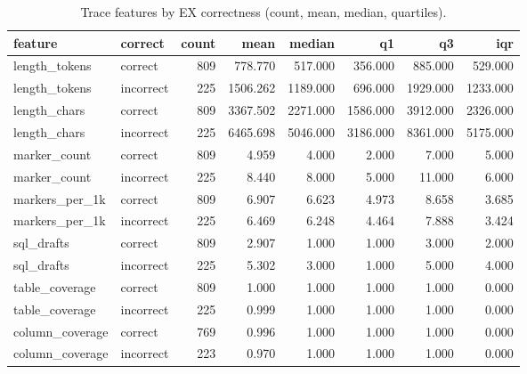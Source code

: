 \begin{table}[htbp]
\caption{Trace features by EX correctness (count, mean, median, quartiles).}
\label{tab:task2_desc_by_correctness}
\begin{tabular}{llrrrrrr}
\toprule
feature & correct & count & mean & median & q1 & q3 & iqr \\
\midrule
length_tokens & correct & 809 & 778.770 & 517.000 & 356.000 & 885.000 & 529.000 \\
length_tokens & incorrect & 225 & 1506.262 & 1189.000 & 696.000 & 1929.000 & 1233.000 \\
length_chars & correct & 809 & 3367.502 & 2271.000 & 1586.000 & 3912.000 & 2326.000 \\
length_chars & incorrect & 225 & 6465.698 & 5046.000 & 3186.000 & 8361.000 & 5175.000 \\
marker_count & correct & 809 & 4.959 & 4.000 & 2.000 & 7.000 & 5.000 \\
marker_count & incorrect & 225 & 8.440 & 8.000 & 5.000 & 11.000 & 6.000 \\
markers_per_1k & correct & 809 & 6.907 & 6.623 & 4.973 & 8.658 & 3.685 \\
markers_per_1k & incorrect & 225 & 6.469 & 6.248 & 4.464 & 7.888 & 3.424 \\
sql_drafts & correct & 809 & 2.907 & 1.000 & 1.000 & 3.000 & 2.000 \\
sql_drafts & incorrect & 225 & 5.302 & 3.000 & 1.000 & 5.000 & 4.000 \\
table_coverage & correct & 809 & 1.000 & 1.000 & 1.000 & 1.000 & 0.000 \\
table_coverage & incorrect & 225 & 0.999 & 1.000 & 1.000 & 1.000 & 0.000 \\
column_coverage & correct & 769 & 0.996 & 1.000 & 1.000 & 1.000 & 0.000 \\
column_coverage & incorrect & 223 & 0.970 & 1.000 & 1.000 & 1.000 & 0.000 \\
\bottomrule
\end{tabular}
\end{table}
